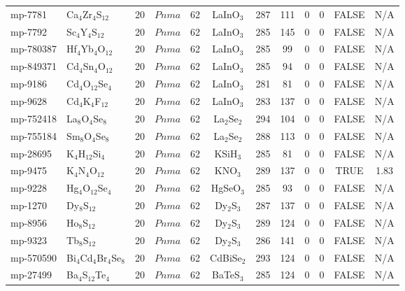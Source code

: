 {\begin{longtable}{llcccccccccc}
    mp-7781 & Ca$_{4}$Zr$_{4}$S$_{12}$ & 20    & $Pnma$ & 62    & LaInO$_{3}$ & 287   & 111   & 0     & 0     & FALSE & N/A \\
    mp-7792 & Sc$_{4}$Y$_{4}$S$_{12}$ & 20    & $Pnma$ & 62    & LaInO$_{3}$ & 285   & 145   & 0     & 0     & FALSE & N/A \\
    mp-780387 & Hf$_{4}$Yb$_{4}$O$_{12}$ & 20    & $Pnma$ & 62    & LaInO$_{3}$ & 285   & 99    & 0     & 0     & FALSE & N/A \\
    mp-849371 & Cd$_{4}$Sn$_{4}$O$_{12}$ & 20    & $Pnma$ & 62    & LaInO$_{3}$ & 285   & 94    & 0     & 0     & FALSE & N/A \\
    mp-9186 & Cd$_{4}$O$_{12}$Se$_{4}$ & 20    & $Pnma$ & 62    & LaInO$_{3}$ & 281   & 81    & 0     & 0     & FALSE & N/A \\
    mp-9628 & Cd$_{4}$K$_{4}$F$_{12}$ & 20    & $Pnma$ & 62    & LaInO$_{3}$ & 283   & 137   & 0     & 0     & FALSE & N/A \\
    mp-752418 & La$_{8}$O$_{4}$Se$_{8}$ & 20    & $Pnma$ & 62    & La$_{2}$Se$_{2}$ & 294   & 104   & 0     & 0     & FALSE & N/A \\
    mp-755184 & Sm$_{8}$O$_{4}$Se$_{8}$ & 20    & $Pnma$ & 62    & La$_{2}$Se$_{2}$ & 288   & 113   & 0     & 0     & FALSE & N/A \\
    mp-28695 & K$_{4}$H$_{12}$Si$_{4}$ & 20    & $Pnma$ & 62    & KSiH$_{3}$ & 285   & 81    & 0     & 0     & FALSE & N/A \\
    mp-9475 & K$_{4}$N$_{4}$O$_{12}$ & 20    & $Pnma$ & 62    & KNO$_{3}$ & 289   & 137   & 0     & 0     & TRUE  & 1.83  \\
    mp-9228 & Hg$_{4}$O$_{12}$Se$_{4}$ & 20    & $Pnma$ & 62    & HgSeO$_{3}$ & 285   & 93    & 0     & 0     & FALSE & N/A \\
    mp-1270 & Dy$_{8}$S$_{12}$ & 20    & $Pnma$ & 62    & Dy$_{2}$S$_{3}$ & 287   & 137   & 0     & 0     & FALSE & N/A \\
    mp-8956 & Ho$_{8}$S$_{12}$ & 20    & $Pnma$ & 62    & Dy$_{2}$S$_{3}$ & 289   & 124   & 0     & 0     & FALSE & N/A \\
    mp-9323 & Tb$_{8}$S$_{12}$ & 20    & $Pnma$ & 62    & Dy$_{2}$S$_{3}$ & 286   & 141   & 0     & 0     & FALSE & N/A \\
    mp-570590 & Bi$_{4}$Cd$_{4}$Br$_{4}$Se$_{8}$ & 20    & $Pnma$ & 62    & CdBiSe$_{2}$ & 293   & 124   & 0     & 0     & FALSE & N/A \\
    mp-27499 & Ba$_{4}$S$_{12}$Te$_{4}$ & 20    & $Pnma$ & 62    & BaTeS$_{3}$ & 285   & 124   & 0     & 0     & FALSE & N/A \\

\end{longtable}}
